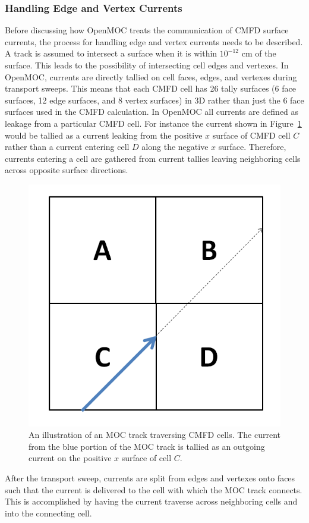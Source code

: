 \subsubsection{Handling Edge and Vertex Currents}

Before discussing how OpenMOC treats the communication of \ac{CMFD} surface currents, the process for handling edge and vertex currents needs to be described. A track is assumed to intersect a surface when it is within $10^{-12}$ cm of the surface. This leads to the possibility of intersecting cell edges and vertexes. In OpenMOC, currents are directly tallied on cell faces, edges, and vertexes during transport sweeps. This means that each \ac{CMFD} cell has 26 tally surfaces (6 face surfaces, 12 edge surfaces, and 8 vertex surfaces) in 3D rather than just the 6 face surfaces used in the \ac{CMFD} calculation. In OpenMOC all currents are defined as leakage from a particular \ac{CMFD} cell. For instance the current shown in Figure~\ref{fig:tally-current} would be tallied as a current leaking from the positive $x$ surface of \ac{CMFD} cell $C$ rather than a current entering cell $D$ along the negative $x$ surface. Therefore, currents entering a cell are gathered from current tallies leaving neighboring cells across opposite surface directions.


\begin{figure}[h!]
	\centering
	\includegraphics[width=0.6\linewidth]{figures/DD/current-transfer.PNG}
	\caption[]{An illustration of an \ac{MOC} track traversing \ac{CMFD} cells. The current from the blue portion of the \ac{MOC} track is tallied as an outgoing current on the positive $x$ surface of cell $C$.}
	\label{fig:tally-current}
\end{figure}

After the transport sweep, currents are split from edges and vertexes onto faces such that the current is delivered to the cell with which the \ac{MOC} track connects. This is accomplished by having the current traverse across neighboring cells and into the connecting cell.

